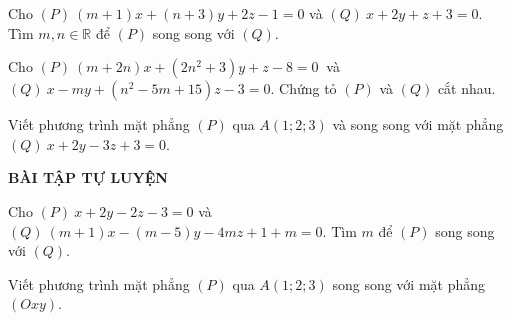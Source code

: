 \begin{vd}%
	Cho $ (P) \ (m + 1)x + (n+3)y + 2z - 1 =0 $ và $ (Q) \ x + 2y + z + 3 = 0 $. Tìm $ m, n \in \mathbb{R} $ để $ (P) $ song song với $ (Q) $.

\end{vd}
\begin{vd}%
	Cho $ (P) \ (m + 2n) x + (2n^2 + 3)y + z -8 = 0  \  $ và $ (Q) \ x - my + (n^2 - 5m + 15)z -3 = 0 $. Chứng tỏ $ (P) $ và $ (Q) $ cắt nhau.	

\end{vd}
\begin{vd}%
	Viết phương trình mặt phẳng $ (P) $ qua $ A(1;2;3) $ và song song với mặt phẳng $ (Q) \ x + 2y - 3z + 3 = 0 $.

\end{vd}
\begin{center}
	\textbf{BÀI TẬP TỰ LUYỆN}
\end{center}
\begin{bt}%
	Cho $ (P) \ x + 2y -2z -3 = 0 $ và $ (Q) \ (m+1)x - (m-5)y - 4mz + 1 + m = 0$. Tìm $ m $ để $ (P) $ song song với $ (Q) $.
\end{bt}
\begin{bt}%
	Viết phương trình mặt phẳng $ (P) $ qua $ A(1;2;3) $ song song với mặt phẳng $ (Oxy) $.
\end{bt}

